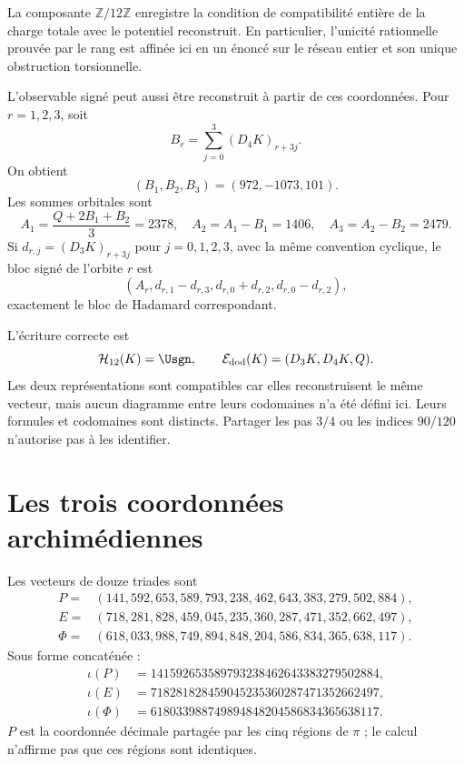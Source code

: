 La composante \(\mathbb Z/12\mathbb Z\) enregistre la condition de
compatibilité entière de la charge totale avec le potentiel reconstruit.
En particulier, l'unicité rationnelle prouvée par le rang est affinée ici en
un énoncé sur le réseau entier et son unique obstruction torsionnelle.

L'observable signé peut aussi être reconstruit à partir de ces coordonnées.
Pour \(r=1,2,3\), soit
\[
B_r=\sum_{j=0}^{3}(D_4K)_{r+3j}.
\]
On obtient
\[
(B_1,B_2,B_3)=(972,-1073,101).
\]
Les sommes orbitales sont
\[
A_1=\frac{Q+2B_1+B_2}{3}=2378,
\quad
A_2=A_1-B_1=1406,
\quad
A_3=A_2-B_2=2479.
\]
Si
\(d_{r,j}=(D_3K)_{r+3j}\) pour \(j=0,1,2,3\), avec la même convention
cyclique, le bloc signé de l'orbite \(r\) est
\[
(A_r,d_{r,1}-d_{r,3},d_{r,0}+d_{r,2},d_{r,0}-d_{r,2}),
\]
exactement le bloc de Hadamard correspondant.

\begin{remark}
L'écriture correcte est
\[
\mathcal H_{12}(K)=\Usgn,
\qquad
\mathcal E_{\mathrm{dod}}(K)=(D_3K,D_4K,Q).
\]
Les deux représentations sont compatibles car elles reconstruisent le même vecteur,
mais aucun diagramme entre leurs codomaines n'a été défini ici. Leurs formules et
codomaines sont distincts. Partager les pas \(3/4\) ou les indices \(90/120\) n'autorise pas
à les identifier.
\end{remark}

\section{Les trois coordonnées archimédiennes}

Les vecteurs de douze triades sont
\[
\begin{aligned}
P={}&(141,592,653,589,793,238,462,643,383,279,502,884),\\
E={}&(718,281,828,459,045,235,360,287,471,352,662,497),\\
\Phi={}&(618,033,988,749,894,848,204,586,834,365,638,117).
\end{aligned}
\]
Sous forme concaténée :
\[
\begin{aligned}
\iota(P)&=141592653589793238462643383279502884,\\
\iota(E)&=718281828459045235360287471352662497,\\
\iota(\Phi)&=618033988749894848204586834365638117.
\end{aligned}
\]
\(P\) est la coordonnée décimale partagée par les cinq régions de
\(\pi\) ; le calcul n'affirme pas que ces régions sont identiques.

